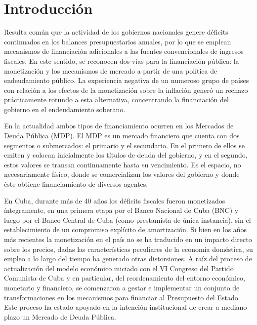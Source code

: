 \chapter*{Introducción}\label{chapter:introduction}


Resulta común que la actividad de los gobiernos nacionales genere déficits 
continuados en los balances presupuestarios anuales, por lo que se emplean mecanismos de financiación adicionales a las fuentes convencionales de 
ingresos fiscales. En este sentido, se reconocen dos vías para la financiación pública: 
la monetización  y los mecanismos de mercado a partir de una política de endeudamiento público. 
La experiencia negativa de un numeroso grupo de países con relación a los efectos de 
la monetización sobre la inflación generó un rechazo prácticamente rotundo a esta 
alternativa, concentrando la financiación del gobierno en el endeudamiento soberano. 

En la actualidad ambos tipos de financiamiento ocurren en los Mercados de Deuda 
Pública (MDP). 
El MDP es un mercado financiero que cuenta con dos segmentos o submercados: el 
primario y el secundario. En el primero de ellos se emiten y colocan inicialmente los 
títulos de deuda del gobierno, y en el segundo, estos valores se transan continuamente 
hasta su vencimiento. Es el espacio, no necesariamente físico, donde se comercializan 
los valores del gobierno y donde éste obtiene financiamiento de diversos agentes. 

En Cuba, durante más de 40 años los déficits fiscales fueron monetizados 
íntegramente, en una primera etapa por el Banco Nacional de Cuba (BNC) y luego por 
el Banco Central de Cuba (como prestamista de única instancia), sin el establecimiento 
de un compromiso explícito de amortización. 
Si bien en los años más recientes la monetización en el país no se ha traducido en un impacto directo sobre los precios, dadas las características peculiares de la economía 
doméstica, su empleo a lo largo del tiempo ha generado otras distorsiones. 
A raíz del proceso de actualización del modelo económico iniciado con el VI Congreso 
del Partido Comunista de Cuba y en particular, del reordenamiento del entorno económico, monetario y financiero, se comenzaron a gestar e implementar un conjunto de transformaciones en los mecanismos para financiar al Presupuesto del Estado. Este proceso ha estado apoyado en la intención institucional de crear a mediano plazo un Mercado de Deuda Pública. 

